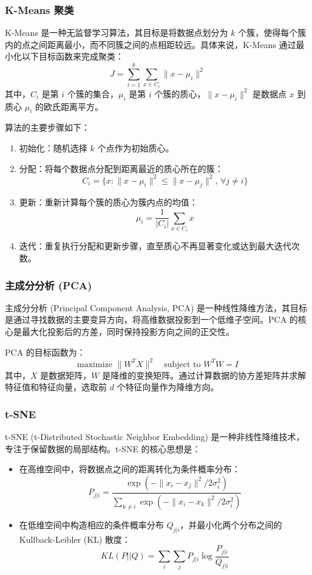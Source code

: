 \documentclass{paper}
\begin{document}
\subsubsection{K-Means 聚类}
K-Means 是一种无监督学习算法，其目标是将数据点划分为 $k$ 个簇，使得每个簇内的点之间距离最小，而不同簇之间的点相距较远。具体来说，K-Means 通过最小化以下目标函数来完成聚类：
\[
J = \sum_{i=1}^k \sum_{x \in C_i} \| x - \mu_i \|^2
\]
其中，$C_i$ 是第 $i$ 个簇的集合，$\mu_i$ 是第 $i$ 个簇的质心，$\| x - \mu_i \|^2$ 是数据点 $x$ 到质心 $\mu_i$ 的欧氏距离平方。

算法的主要步骤如下：
\begin{enumerate}
    \item 初始化：随机选择 $k$ 个点作为初始质心。
    \item 分配：将每个数据点分配到距离最近的质心所在的簇：
    \[
    C_i = \{x : \| x - \mu_i \|^2 \leq \| x - \mu_j \|^2, \, \forall j \neq i \}
    \]
    \item 更新：重新计算每个簇的质心为簇内点的均值：
    \[
    \mu_i = \frac{1}{|C_i|} \sum_{x \in C_i} x
    \]
    \item 迭代：重复执行分配和更新步骤，直至质心不再显著变化或达到最大迭代次数。
\end{enumerate}

\subsubsection{主成分分析 (PCA)}
主成分分析 (Principal Component Analysis, PCA) 是一种线性降维方法，其目标是通过寻找数据的主要变异方向，将高维数据投影到一个低维子空间。PCA 的核心是最大化投影后的方差，同时保持投影方向之间的正交性。

PCA 的目标函数为：
\[
\text{maximize } \| W^T X \|^2 \quad \text{subject to } W^T W = I
\]
其中，$X$ 是数据矩阵，$W$ 是降维的变换矩阵。通过计算数据的协方差矩阵并求解特征值和特征向量，选取前 $d$ 个特征向量作为降维方向。

\subsubsection{t-SNE}
t-SNE (t-Distributed Stochastic Neighbor Embedding) 是一种非线性降维技术，专注于保留数据的局部结构。t-SNE 的核心思想是：
\begin{itemize}
    \item 在高维空间中，将数据点之间的距离转化为条件概率分布：
    \[
    P_{j|i} = \frac{\exp(-\|x_i - x_j\|^2 / 2\sigma_i^2)}{\sum_{k \neq i} \exp(-\|x_i - x_k\|^2 / 2\sigma_i^2)}
    \]
    \item 在低维空间中构造相应的条件概率分布 $Q_{j|i}$，并最小化两个分布之间的 Kullback-Leibler (KL) 散度：
    \[
    KL(P||Q) = \sum_i \sum_j P_{j|i} \log \frac{P_{j|i}}{Q_{j|i}}
    \]
\end{itemize}
\end{document}
